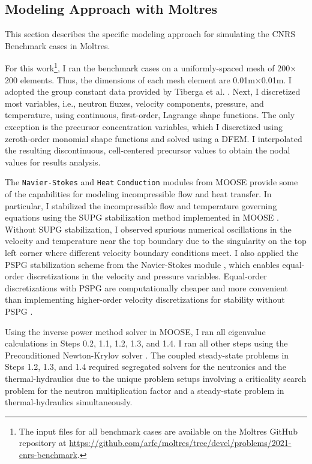 \subsection{Modeling Approach with Moltres} \label{sec:model}

This section describes the specific modeling approach for
simulating the CNRS Benchmark cases in Moltres.

For this work\footnote{The input files for
all benchmark
cases are available on the Moltres GitHub repository at 
\url{https://github.com/arfc/moltres/tree/devel/problems/2021-cnrs-benchmark}.
}, I ran the benchmark cases on a uniformly-spaced mesh
of 200$\times$200 elements. Thus, the dimensions of each mesh element are
0.01m$\times$0.01m. I adopted the group constant data
provided by Tiberga et al. \cite{tiberga_results_2020}. Next, I
discretized most variables, i.e., neutron fluxes, velocity
components, pressure, and temperature, using continuous, first-order, Lagrange
shape functions. The only exception is the precursor concentration variables,
which I discretized using zeroth-order monomial shape functions and solved
using a \gls{DFEM}. I interpolated the resulting discontinuous,
cell-centered precursor values to obtain the nodal values for results
analysis.

The
\texttt{Navier-Stokes} and \texttt{Heat} \texttt{Conduction} modules from
\gls{MOOSE} provide some of the capabilities for
modeling incompressible flow and heat transfer. In particular, I stabilized
the incompressible flow and temperature governing equations using the
\gls{SUPG} stabilization method implemented in \gls{MOOSE}
\cite{peterson_overview_2018}. Without \gls{SUPG} stabilization, I
observed spurious numerical oscillations in the velocity and temperature near
the top boundary due to the singularity on the top left corner where different
velocity boundary conditions meet. I also applied the \gls{PSPG} stabilization
scheme \cite{hughes_new_1986} from the Navier-Stokes module
\cite{peterson_overview_2018},
which enables equal-order discretizations in the velocity and pressure
variables. Equal-order discretizations with \gls{PSPG} are computationally
cheaper and more convenient than implementing higher-order
velocity discretizations for stability without \gls{PSPG}
\cite{chapelle_inf-sup_1993}.

Using the inverse power method solver in \gls{MOOSE}, I ran all eigenvalue calculations in
Steps 0.2, 1.1, 1.2, 1.3, and 1.4. I ran all other steps
using the Preconditioned Newton-Krylov solver
\cite{gaston_physics-based_2015}. The coupled steady-state problems in
Steps 1.2, 1.3, and 1.4 required segregated solvers for the neutronics
and the thermal-hydraulics due to the unique problem setups involving a
criticality search problem for the neutron multiplication factor
and a steady-state problem in thermal-hydraulics simultaneously.

